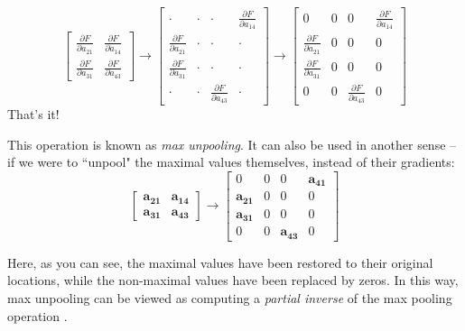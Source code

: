 \documentclass{article}[a4paper]
\begin{document}
\begin{equation*}
	\renewcommand{\arraystretch}{1.5}
	\begin{bmatrix}
		\frac{\partial F}{\partial a_{21}} & \frac{\partial F}{\partial a_{14}} \\
		\frac{\partial F}{\partial a_{31}} & \frac{\partial F}{\partial a_{43}}
	\end{bmatrix} \rightarrow
	\begin{bmatrix}
		\cdot & \cdot & \cdot & \frac{\partial F}{\partial a_{14}} \\
		\frac{\partial F}{\partial a_{21}} & \cdot & \cdot & \cdot \\
		\frac{\partial F}{\partial a_{31}} & \cdot & \cdot & \cdot \\
		\cdot & \cdot & \frac{\partial F}{\partial a_{43}} & \cdot
	\end{bmatrix} \rightarrow
	\begin{bmatrix}
		0 & 0 & 0 & \frac{\partial F}{\partial a_{14}} \\
		\frac{\partial F}{\partial a_{21}} & 0 & 0 & 0 \\
		\frac{\partial F}{\partial a_{31}} & 0 & 0 & 0 \\
		0 & 0 & \frac{\partial F}{\partial a_{43}} & 0
	\end{bmatrix}
\end{equation*}
That's it!

This operation is known as \textit{max unpooling}. It can also be used in another sense -- if we were to ``unpool" the maximal values themselves, instead of their gradients:
\begin{equation*}
	\begin{bmatrix}
		\mathbf{a_{21}} & \mathbf{a_{14}} \\
		\mathbf{a_{31}} & \mathbf{a_{43}}
	\end{bmatrix} \rightarrow
	\begin{bmatrix}
		0 & 0 & 0 & \mathbf{a_{41}} \\
		\mathbf{a_{21}} & 0 & 0 & 0 \\
		\mathbf{a_{31}} & 0 & 0 & 0 \\
		0 & 0 & \mathbf{a_{43}} & 0
	\end{bmatrix}
\end{equation*}

Here, as you can see, the maximal values have been restored to their original locations, while the non-maximal values have been replaced by zeros. In this way, max unpooling can be viewed as computing a \textit{partial inverse} of the max pooling operation \cite{zeiler2014visualizing}.
\end{document}
